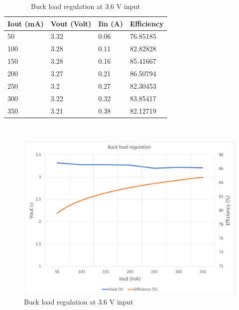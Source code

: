 \begin{table}[H]
\centering
\begin{tabular}{|l|l|l|l|}
\hline
Iout (mA) & Vout (Volt) & Iin (A) & Efficiency \\ \hline
50        & 3.32        & 0.06    & 76.85185   \\ \hline
100       & 3.28        & 0.11    & 82.82828   \\ \hline
150       & 3.28        & 0.16    & 85.41667   \\ \hline
200       & 3.27        & 0.21    & 86.50794   \\ \hline
250       & 3.2         & 0.27    & 82.30453   \\ \hline
300       & 3.22        & 0.32    & 83.85417   \\ \hline
350       & 3.21        & 0.38    & 82.12719   \\ \hline
\end{tabular}
\caption{Buck load regulation at 3.6 V input}
\label{table:4}
\end{table}
\\
\begin{figure}[H]
	\centering
	\includegraphics[width=\columnwidth]{IMGS/Buck load regulation at 3.6V input.pdf}
	\caption{ Buck load regulation at 3.6 V input}
	\label{fig:arch}
\end{figure}
\\
